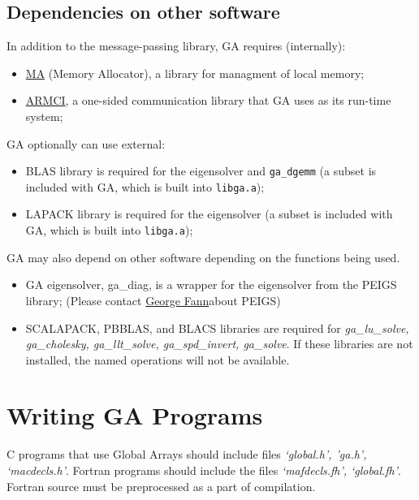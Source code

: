 \subsection{Dependencies on other software }

In addition to the message-passing library, GA requires (internally):
\begin{itemize}
\item \href{http://www.emsl.pnl.gov/docs/parsoft/ma/MAapi.html}{MA} (Memory
Allocator), a library for managment of local memory; 
\item \href{http://www.emsl.pnl.gov/docs/parsoft/armci}{ARMCI}, a one-sided
communication library that GA uses as its run-time system; 
\end{itemize}
GA optionally can use external: 
\begin{itemize}
\item BLAS library is required for the eigensolver and \texttt{ga\_dgemm}
(a subset is included with GA, which is built into \texttt{libga.a});
\item LAPACK library is required for the eigensolver (a subset is included
with GA, which is built into \texttt{libga.a}); 
\end{itemize}
GA may also depend on other software depending on the functions being
used.
\begin{itemize}
\item GA eigensolver, ga\_diag, is a wrapper for the eigensolver from the
PEIGS library; (Please contact \href{mailto:fanngi@ornl.gov}{George Fann}about
PEIGS) 
\item SCALAPACK, PBBLAS, and BLACS libraries are required for \emph{ga\_lu\_solve,
ga\_cholesky, ga\_llt\_solve, ga\_spd\_invert, ga\_solve}. If these
libraries are not installed, the named operations will not be available. 
\end{itemize}

\section{Writing GA Programs }

C programs that use Global Arrays should include files \emph{`global.h',
'ga.h', `macdecls.h'}. Fortran programs should include the files \emph{`mafdecls.fh',
`global.fh'}. Fortran source must be preprocessed as a part of compilation.

